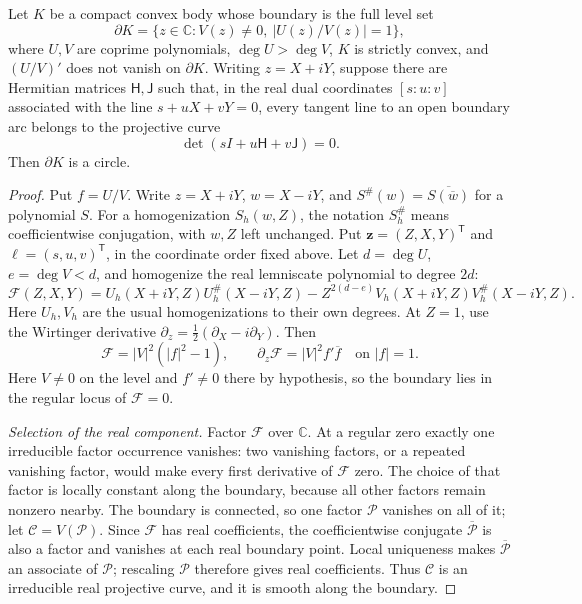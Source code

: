 \documentclass[preprints,article,submit,oneauthor]{Definitions/mdpi}
\numberwithin{equation}{section}
\newcommand{\C}{\mathbb C}
\begin{document}
\begin{Proposition}\label{prop:circle}
Let \(K\) be a compact convex body whose boundary is the full level set
\[
 \partial K=\{z\in\C:V(z)\neq0,\ |U(z)/V(z)|=1\},    \tag{7.1}
\]
where \(U,V\) are coprime polynomials, \(\deg U>\deg V\), \(K\) is strictly
convex, and \((U/V)'\) does not vanish on \(\partial K\).  Writing
\(z=X+iY\), suppose there are Hermitian matrices \(\mathsf H,\mathsf J\) such
that, in the real dual coordinates
\([s:u:v]\) associated with the line \(s+uX+vY=0\), every tangent line to an
open boundary arc belongs to the projective curve
\[
 \det(sI+u\mathsf H+v\mathsf J)=0.                   \tag{7.2}
\]
Then \(\partial K\) is a circle.
\end{Proposition}

\begin{proof}
Put \(f=U/V\).  Write \(z=X+iY\), \(w=X-iY\), and
\(S^\#(w)=\overline{S(\overline w)}\) for a polynomial \(S\).
For a homogenization \(S_h(w,Z)\), the notation \(S_h^\#\) means
coefficientwise conjugation, with \(w,Z\) left unchanged.
Put \(\mathbf z=(Z,X,Y)^{\mathsf T}\) and
\(\boldsymbol\ell=(s,u,v)^{\mathsf T}\), in the coordinate order fixed above.
Let \(d=\deg U\), \(e=\deg V<d\), and homogenize the real lemniscate polynomial
to degree \(2d\):
\[
 \mathscr F(Z,X,Y)=
 U_h(X+iY,Z)U_h^\#(X-iY,Z)
 -Z^{2(d-e)}V_h(X+iY,Z)V_h^\#(X-iY,Z).               \tag{7.3}
\]
Here \(U_h,V_h\) are the usual homogenizations to their own degrees.  At
\(Z=1\), use the Wirtinger derivative
\(\partial_z=\tfrac12(\partial_X-i\partial_Y)\).  Then
\[
 \mathscr F=|V|^2(|f|^2-1),\qquad
 \partial_z\mathscr F=|V|^2 f'\overline f
 \quad\text{on }|f|=1.
\]
Here \(V\neq0\) on the level and \(f'\neq0\) there by hypothesis, so the
boundary lies in the regular locus of \(\mathscr F=0\).

\medskip\noindent\emph{Selection of the real component.}
Factor \(\mathscr F\) over \(\C\).  At a regular zero exactly one irreducible
factor occurrence vanishes: two vanishing factors, or a repeated vanishing
factor, would make every first derivative of \(\mathscr F\) zero.  The choice
of that factor is locally constant along the boundary, because all other
factors remain nonzero nearby.  The boundary is connected, so one factor
\(\mathscr P\) vanishes on all of it; let \(\mathscr C=V(\mathscr P)\).
Since \(\mathscr F\) has real coefficients, the coefficientwise conjugate
\(\overline{\mathscr P}\) is also a factor and vanishes at each real boundary
point.  Local uniqueness makes \(\overline{\mathscr P}\) an associate of
\(\mathscr P\); rescaling \(\mathscr P\) therefore gives real coefficients.
Thus \(\mathscr C\) is an irreducible real projective curve, and it is smooth
along the boundary.


\end{proof}
\end{document}
